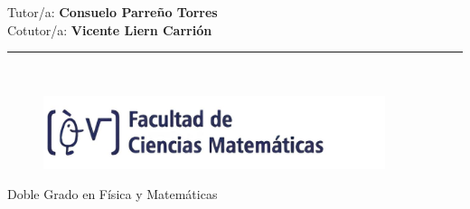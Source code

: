 \begin{titlepage}
\begin{center}
    \begin{Large}
    Tutor/a: {\bf \sc
    Consuelo Parreño Torres} \\
    Cotutor/a: {\bf \sc
    Vicente Liern Carrión} \\
    \end{Large}
    
    \vspace*{0.5in}
    
    \rule{110mm}{0.1mm}\\
    
    
    \hspace{-0.5cm}
    \begin{minipage}[t]{.45\textwidth}
    \raggedleft
    \begin{figure}[H]
    
    \includegraphics[width=10cm]{LogoFac_Esp.jpg}
    \end{figure}
    \end{minipage}
    \hfill
    \noindent 
    \begin{minipage}[t]{.45\textwidth}
    \raggedleft
    
    \vspace{1.7cm}
    \hspace{-2cm}
    \begin{Large}\hspace{-0.5cm}
    Doble Grado en Física y Matemáticas\\
    \end{Large}
    \end{minipage}
    \end{center}
    \end{titlepage}